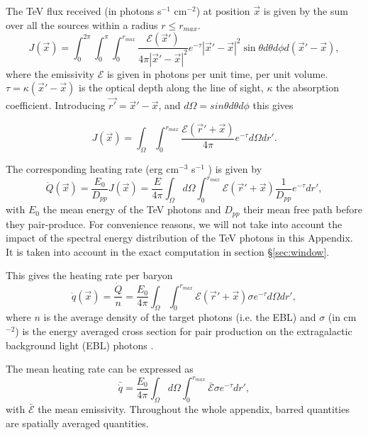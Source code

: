 \documentclass[twocolumns]{emulateapj}
\begin{document}
The TeV flux received (in photons s$^{-1}$ cm$^{-2}$) at position $\vec{x}$ is given by the sum over all the sources within a radius $r\leqslant r_{max}$.
\begin{equation}
  \label{eq:flux_recu0}
  J(\vec{x})=\int_{0}^{2\pi}\int_{0}^{\pi}\int_0^{r_{max}}   \frac{\mathcal{E}(\vec{x}') }{4\pi |\vec{x}'-\vec{x}|^2} e^{-\tau} |\vec{x}'-\vec{x}|^2 \sin\theta d\theta d\phi d(\vec{x}'-\vec{x}),
\end{equation}
where the emissivity $\mathcal{E}$ is given in photons per unit time, per unit volume. $\tau=\kappa (\vec{x}'-\vec{x})$ is the optical depth along the line of sight, $\kappa$ the absorption coefficient.
Introducing $\vec{r'}=\vec{x}'-\vec{x}$, and $d\Omega=sin\theta d\theta d\phi$ this gives


\begin{equation}
  \label{eq:flux_recu}
  J(\vec{x})=\int_{\Omega}\int_0^{r_{max}}   \frac{\mathcal{E}(\vec{r}'+\vec{x}) }{4\pi } e^{-\tau} d\Omega dr'.
\end{equation}

The corresponding heating rate (erg cm$^{-3}$ s$^{-1}$ ) is given by 
\begin{equation}
  \label{eq:heating_rate0}
  \dot{Q}(\vec{x})=\frac{E_0}{D_{pp}}J(\vec{x}) =\frac{E}{4\pi}   \int_{\Omega}d\Omega\int_0^{r_{max}}   \mathcal{E}(\vec{r}'+\vec{x}) \frac{1}{D_{pp}}  e^{-\tau} dr' ,
\end{equation}
with $E_0$ the mean energy of the TeV photons and $D_{pp}$ their mean free path  before they pair-produce. For convenience reasons,  we will not take into account the impact of the spectral energy distribution of the TeV photons in this Appendix. It is taken into account in the exact computation in section \S\ref{sec:window}.

This gives the  heating rate per baryon
\begin{equation}
  \label{eq:heating_rate0}
  \dot{q}(\vec{x})=\frac{\dot{Q}}{n}= \frac{E_0}{4\pi}  \int_{\Omega}\int_0^{r_{max}}   \mathcal{E}(\vec{r}'+\vec{x})\sigma  e^{-\tau}d\Omega dr' ,
\end{equation}
where $n$ is the average density of the target photons (i.e. the EBL) and $\sigma$ (in cm$^{-2}$) is the energy averaged cross section for pair production on the extragalactic background light (EBL) photons \citep{1967PhRv..155.1408G}. 


The mean heating rate can be expressed as
\begin{equation}
  \label{eq:heating_rate0}
  \bar{\dot{q}}=\frac{E_0}{4\pi} \int_{\Omega}d\Omega\int_0^{r_{max}}  \bar{\mathcal{E}}\sigma  e^{-\tau}dr', 
\end{equation}
with $\bar{\mathcal{E}}$ the mean emissivity. Throughout the whole appendix, barred quantities are spatially averaged quantities.
\end{document}
